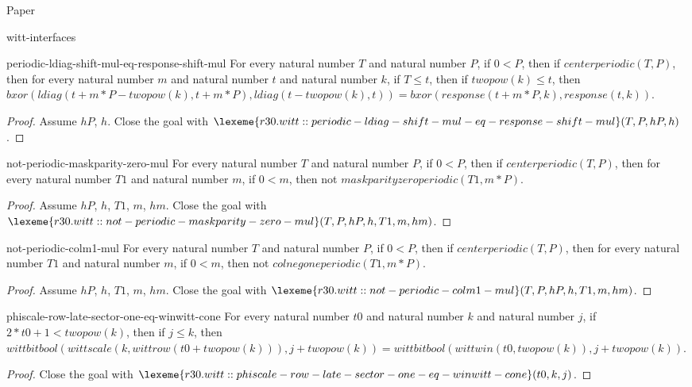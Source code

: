 \begin{lexlean}{Paper}
\begin{section}{witt-interfaces}
  \begin{theorem}{periodic-ldiag-shift-mul-eq-response-shift-mul}
  For every natural number \(T\) and natural number \(P\), if \(0 < P\), then if \(centerperiodic(T, P)\), then for every natural number \(m\) and natural number \(t\) and natural number \(k\), if \(T ≤ t\), then if \(twopow(k) ≤ t\), then \(bxor(ldiag(t + m * P - twopow(k), t + m * P), ldiag(t - twopow(k), t)) = bxor(response(t + m * P, k), response(t, k))\).
  \begin{proof}
  Assume \(hP\), \(h\).
  Close the goal with \(\lexeme{r30.witt::periodic-ldiag-shift-mul-eq-response-shift-mul}(T, P, hP, h)\).
  \end{proof}
  \end{theorem}

  \begin{theorem}{not-periodic-maskparity-zero-mul}
  For every natural number \(T\) and natural number \(P\), if \(0 < P\), then if \(centerperiodic(T, P)\), then for every natural number \(T1\) and natural number \(m\), if \(0 < m\), then not \(maskparityzeroperiodic(T1, m * P)\).
  \begin{proof}
  Assume \(hP\), \(h\), \(T1\), \(m\), \(hm\).
  Close the goal with \(\lexeme{r30.witt::not-periodic-maskparity-zero-mul}(T, P, hP, h, T1, m, hm)\).
  \end{proof}
  \end{theorem}

  \begin{theorem}{not-periodic-colm1-mul}
  For every natural number \(T\) and natural number \(P\), if \(0 < P\), then if \(centerperiodic(T, P)\), then for every natural number \(T1\) and natural number \(m\), if \(0 < m\), then not \(colnegoneperiodic(T1, m * P)\).
  \begin{proof}
  Assume \(hP\), \(h\), \(T1\), \(m\), \(hm\).
  Close the goal with \(\lexeme{r30.witt::not-periodic-colm1-mul}(T, P, hP, h, T1, m, hm)\).
  \end{proof}
  \end{theorem}

  \begin{theorem}{phiscale-row-late-sector-one-eq-winwitt-cone}
  For every natural number \(t0\) and natural number \(k\) and natural number \(j\), if \(2 * t0 + 1 < twopow(k)\), then if \(j ≤ k\), then \(wittbitbool(wittscale(k, wittrow(t0 + twopow(k))), j + twopow(k)) = wittbitbool(wittwin(t0, twopow(k)), j + twopow(k))\).
  \begin{proof}
  Close the goal with \(\lexeme{r30.witt::phiscale-row-late-sector-one-eq-winwitt-cone}(t0, k, j)\).
  \end{proof}
  \end{theorem}


\end{section}
\end{lexlean}
